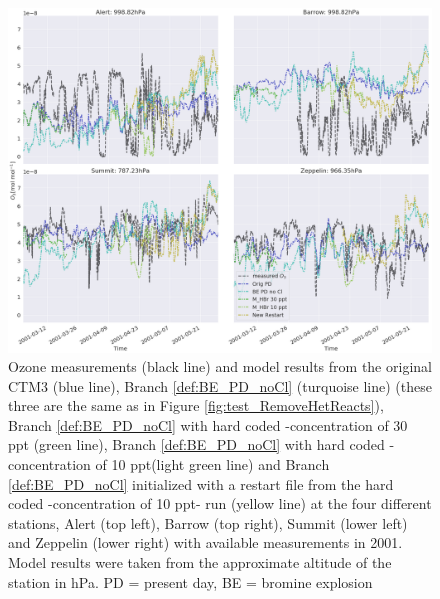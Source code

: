 \begin{figure}[ht]
    \centering
    \includegraphics[width=\linewidth]{Chapter6_Results/images/ozone_stationComp_2001/ozone_noCl_step2.png}
    \caption{Ozone measurements (black line) and model results from the original CTM3 (blue line), Branch \ref{def:BE_PD_noCl} (turquoise line) (these three are the same as in Figure \ref{fig:test_RemoveHetReacts}), Branch \ref{def:BE_PD_noCl} with hard coded -concentration of 30 ppt (green line), Branch \ref{def:BE_PD_noCl} with hard coded -concentration of 10 ppt(light green line) and Branch \ref{def:BE_PD_noCl} initialized with a restart file from the hard coded -concentration of 10 ppt- run (yellow line) at the four different stations, Alert (top left), Barrow (top right), Summit (lower left) and Zeppelin (lower right) with available measurements in 2001. Model results were taken from the approximate altitude of the station in hPa. PD = present day, BE = bromine explosion}
    \label{fig:ozone_noCl_step2}
\end{figure}